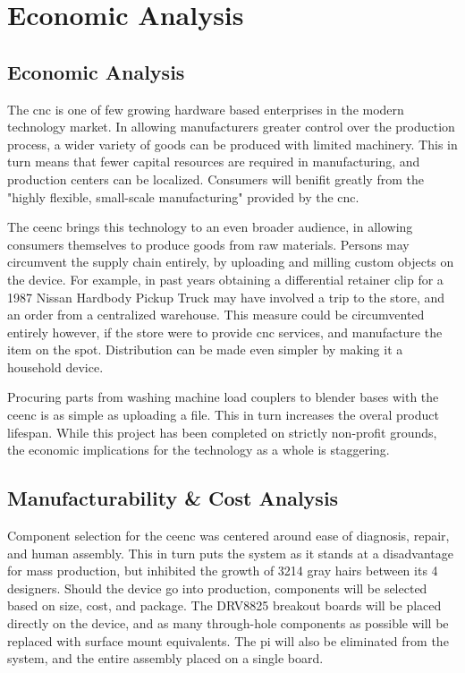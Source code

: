 \chapter{Economic Analysis}
\section{Economic Analysis}
The \gls{cnc} is one of few growing hardware based enterprises in the modern technology market.
In allowing manufacturers greater control over the production process, a wider variety of goods can be produced with limited machinery.
This in turn means that fewer capital resources are required in manufacturing, and production centers can be localized.
Consumers will benifit greatly from the "highly flexible, small-scale manufacturing"\cite{3dprintimpact} provided by the \gls{cnc}.

The \gls{ceenc} brings this technology to an even broader audience, in allowing consumers themselves to produce goods from raw materials.
Persons may circumvent the supply chain entirely, by uploading and milling custom objects on the device.\cite{3dprintsave}
For example, in past years obtaining a differential retainer clip for a 1987 Nissan Hardbody Pickup Truck may have involved a trip to the store, and an order from a centralized warehouse.
This measure could be circumvented entirely however, if the store were to provide \gls{cnc} services, and manufacture the item on the spot. 
Distribution can be made even simpler by making it a household device.

Procuring parts from washing machine load couplers to blender bases with the \gls{ceenc} is as simple as uploading a file.
This in turn increases the overal product lifespan.
While this project has been completed on strictly non-profit grounds, the economic implications for the technology as a whole is staggering.

\section{Manufacturability \& Cost Analysis}
Component selection for the \gls{ceenc} was centered around ease of diagnosis, repair, and human assembly.
This in turn puts the system as it stands at a disadvantage for mass production, but inhibited the growth of 3214 gray hairs between its 4 designers.
Should the device go into production, components will be selected based on size, cost, and package. 
The DRV8825 breakout boards will be placed directly on the device, and as many through-hole components as possible will be replaced with surface mount equivalents.
The \gls{pi} will also be eliminated from the system, and the entire assembly placed on a single board.

